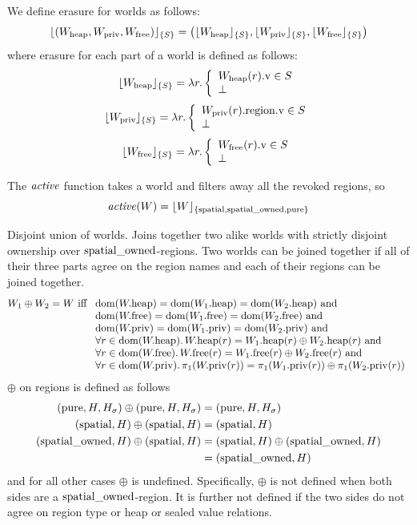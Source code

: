 \documentclass[a4paper]{article}
\begin{document}
We define erasure for worlds as follows:
\[
\erase{(W_{\mathrm{heap}},W_{\mathrm{priv}},W_{\mathrm{free}})}{S} =
  \left( \erase{W_{\mathrm{heap}}}{S},\erase{W_{\mathrm{priv}}}{S},\erase{W_{\mathrm{free}}}{S} \right)
\]
where erasure for each part of a world is defined as follows:
\[
\erase{W_{\mathrm{heap}}}{S} = \lambda r \ldotp \left\{
    \begin{array}{l}
      \prv{W_{\mathrm{heap}}(r)} \in S\\
      \bot
    \end{array}
  \right.
\]
\[
\erase{W_{\mathrm{priv}}}{S} = \lambda r \ldotp \left\{
    \begin{array}{l}
      \prv{\pregion{W_{\mathrm{priv}}(r)}} \in S \\
      \bot
    \end{array}
  \right.
\]
\[
\erase{W_{\mathrm{free}}}{S} = \lambda r \ldotp \left\{
    \begin{array}{l}
      \prv{W_{\mathrm{free}}(r)} \in S\\
      \bot
    \end{array}
  \right.
\]

The $\activeReg{}$ function takes a world and filters away all the revoked regions, so
\[
  \activeReg{W} = \erase{W}{\spatial,\spatialo,\pure}
\]

Disjoint union of worlds. Joins together two alike worlds with strictly disjoint ownership over $\spatialo$-regions. Two worlds can be joined together if all of their three parts agree on the region names and each of their regions can be joined together.
\[
  W_1 \oplus W_2 = W
  \text{ iff }
  \begin{array}[t]{l}
    \text{$\dom(\pwheap) = \dom(\pwheap[W_1]) = \dom(\pwheap[W_2]) \tand$} \\
    \text{$\dom(\pwfree) = \dom(\pwfree[W_1]) = \dom(\pwfree[W_2]) \tand$} \\
    \text{$\dom(\pwpriv) = \dom(\pwpriv[W_1]) = \dom(\pwpriv[W_2]) \tand$} \\
    \forall r \in \dom(\pwheap) \ldotp \pwheap(r) = \pwheap[W_1](r) \oplus \pwheap[W_2](r) \tand \\
    \forall r \in \dom(\pwfree) \ldotp \pwfree(r) = \pwfree[W_1](r) \oplus \pwfree[W_2](r) \tand \\
    \forall r \in \dom(\pwpriv) \ldotp \pi_1(\pwpriv(r)) = \pi_1(\pwpriv[W_1](r)) \oplus \pi_1(\pwpriv[W_2](r))
  \end{array}
\]
$\oplus$ on regions is defined as follows
\begin{align*}
  (\pure,H,H_\sigma) \oplus (\pure,H,H_\sigma) =  & \; (\pure,H,H_\sigma) \\
  (\spatial,H) \oplus (\spatial,H) =  & \; (\spatial,H) \\
  (\spatialo,H) \oplus (\spatial,H) = & \; (\spatial,H) \oplus (\spatialo,H)\\
                                           =  & \; (\spatialo,H)
\end{align*}
and for all other cases $\oplus$ is undefined. Specifically, $\oplus$ is not defined when both sides are a $\spatialo$-region. It is further not defined if the two sides do not agree on region type or heap or sealed value relations.
\end{document}
